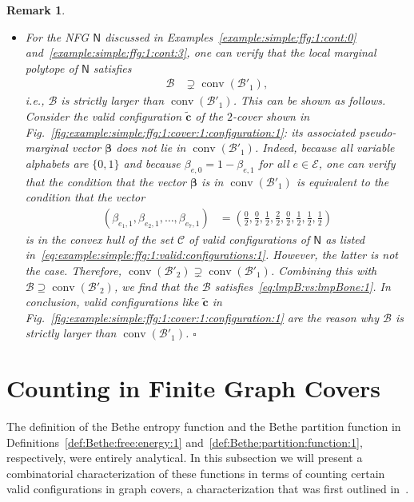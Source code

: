 \documentclass[journal, twocolumn]{IEEEtran}
\renewcommand{\mathbf}[1]{{\bm{#1}}}
\newcommand{\ie}{\emph{i.e.}}
\newcommand{\vect}[1]{\mathbf{#1}}
\newcommand{\code}[1]{\mathcal{#1}}
\newcommand{\set}[1]{\mathcal{#1}}
\newcommand{\graph}[1]{\mathsf{#1}}
\newcommand{\codeC}{\code{C}}
\newcommand{\bel}{\beta}
\newcommand{\vbel}{\boldsymbol{\bel}}
\newcommand{\setE}{\set{E}}
\newcommand{\lmpB}{\mathcal{B}}
\newcommand{\lmpBdown}[1]{\mathcal{B}'_{#1}}
\newcommand{\graphN}{\graph{N}}
\newcommand{\convhull}{\operatorname{conv}}
\newcommand{\?}{\mathrm{?}}
\newcommand{\tvc}{\vect{\tilde{c}}}
\newcommand{\qedwhite}{\hspace*{\fill}%
  $\square$\smallskip}
\newcommand{\remarkend}{\qedwhite}
\newtheorem{Remark}[Lemma]{Remark}
\begin{document}
\begin{Remark}
\begin{itemize}
  \item For the NFG $\graphN$ discussed in
    Examples~\ref{example:simple:ffg:1:cont:0}
    and~\ref{example:simple:ffg:1:cont:3}, one can verify that the local
    marginal polytope of $\graphN$ satisfies
    \begin{align}
      \lmpB
        &\supsetneq
           \convhull(\lmpBdown{1}),
             \label{eq:lmpB:vs:lmpBone:1}
    \end{align}
    \ie, $\lmpB$ is strictly larger than $\convhull(\lmpBdown{1})$. This can be
    shown as follows. Consider the valid configuration $\tvc$ of the $2$-cover
    shown in Fig.~\ref{fig:example:simple:ffg:1:cover:1:configuration:1}:
    its associated pseudo-marginal vector $\vbel$ does not lie in
    $\convhull(\lmpBdown{1})$. Indeed, because all variable alphabets are $\{ 0, 1
    \}$ and because $\bel_{e,0} = 1 - \bel_{e,1}$ for all $e \in \setE$, one
    can verify that the condition that the vector $\vbel$ is in
    $\convhull(\lmpBdown{1})$ is equivalent to the condition that the vector
    \begin{align*}
      (\bel_{e_1,1}, \bel_{e_2,1}, \ldots, \bel_{e_7,1})
        &=
        \left(
          \frac{0}{2}, \frac{0}{2}, \frac{1}{2}, \frac{2}{2}, 
          \frac{0}{2}, \frac{1}{2}, \frac{1}{2}, \frac{1}{2} 
        \right)
    \end{align*}
    is in the convex hull of the set $\codeC$ of valid configurations of
    $\graphN$ as listed
    in~\eqref{eq:example:simple:ffg:1:valid:configurations:1}. However, the
    latter is not the case. Therefore, $\convhull(\lmpBdown{2}) \supsetneq
    \convhull(\lmpBdown{1})$. Combining this with $\lmpB \supseteq
    \convhull(\lmpBdown{2})$, we find that the $\lmpB$
    satisfies~\eqref{eq:lmpB:vs:lmpBone:1}. In conclusion, valid
    configurations like $\tvc$ in
    Fig.~\ref{fig:example:simple:ffg:1:cover:1:configuration:1} are the
    reason why $\lmpB$ is strictly larger than $\convhull(\lmpBdown{1})$.
    \remarkend

  \end{itemize}
\end{Remark}


\section{Counting in Finite Graph Covers}
\label{sec:counting:in:finite:graph:covers:1}


The definition of the Bethe entropy function and the Bethe partition function
in Definitions~\ref{def:Bethe:free:energy:1}
and~\ref{def:Bethe:partition:function:1}, respectively, were entirely
analytical. In this subsection we will present a combinatorial
characterization of these functions in terms of counting certain valid
configurations in graph covers, a characterization that was first outlined
in~\cite{Vontobel:08:3, Vontobel:09:Talk:5}.
\end{document}
